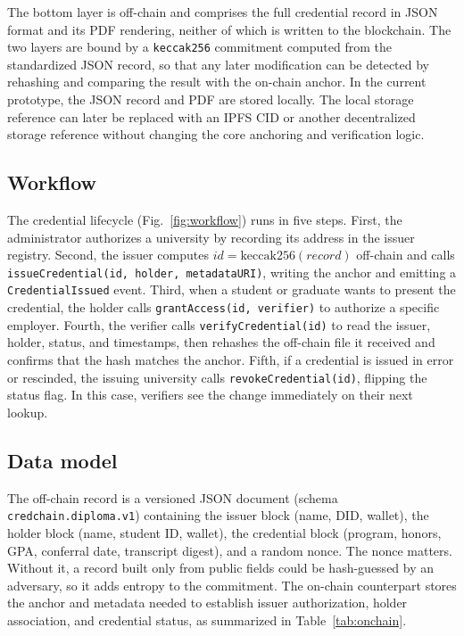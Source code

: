 \documentclass[conference]{IEEEtran}
\begin{document}
The bottom layer is off-chain and comprises the full credential record in JSON format and its PDF rendering, neither of which is written to the blockchain. The two layers are bound by a \verb|keccak256| commitment computed from the standardized JSON record, so that any later modification can be detected by rehashing and comparing the result with the on-chain anchor. In the current prototype, the JSON record and PDF are stored locally. The local storage reference can later be replaced with an IPFS CID or another decentralized storage reference without changing the core anchoring and verification logic.

\subsection{Workflow}
The credential lifecycle (Fig.~\ref{fig:workflow}) runs in five steps. First, the administrator authorizes a university by recording its address in the issuer registry. Second, the issuer computes $\mathit{id}=\mathrm{keccak256}(\mathit{record})$ off-chain and calls \texttt{issueCredential(id, holder, metadataURI)}, writing the anchor and emitting a \texttt{CredentialIssued} event. Third, when a student or graduate wants to present the credential, the holder calls \texttt{grantAccess(id, verifier)} to authorize a specific employer. Fourth, the verifier calls \texttt{verifyCredential(id)} to read the issuer, holder, status, and timestamps, then rehashes the off-chain file it received and confirms that the hash matches the anchor. Fifth, if a credential is issued in error or rescinded, the issuing university calls \texttt{revokeCredential(id)}, flipping the status flag. In this case, verifiers see the change immediately on their next lookup.

\subsection{Data model}
The off-chain record is a versioned JSON document (schema \texttt{credchain.diploma.v1}) containing the issuer block (name, DID, wallet), the holder block (name, student ID, wallet), the credential block (program, honors, GPA, conferral date, transcript digest), and a random nonce. The nonce matters. Without it, a record built only from public fields could be hash-guessed by an adversary, so it adds entropy to the commitment. The on-chain counterpart stores the anchor and metadata needed to establish issuer authorization, holder association, and credential status, as summarized in Table~\ref{tab:onchain}.
\end{document}
